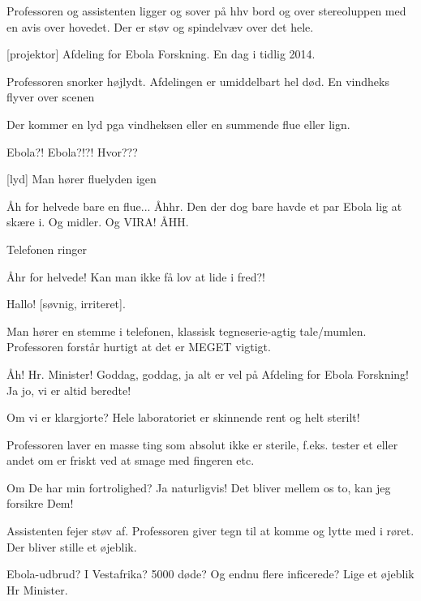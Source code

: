 \documentclass[a4paper,11pt]{article}
\begin{document}
\begin{sketch}

\scene Professoren og assistenten ligger og sover på hhv bord og over stereoluppen med en avis over hovedet. Der er støv og spindelvæv over det hele.

[projektor] Afdeling for Ebola Forskning. En dag i tidlig 2014.

\scene Professoren snorker højlydt. Afdelingen er umiddelbart hel død. En vindheks flyver over scenen 

\scene Der kommer en lyd pga vindheksen eller en summende flue eller lign.


 Ebola?! Ebola?!?! Hvor???

[lyd] Man hører fluelyden igen

 Åh for helvede bare en flue... Åhhr. Den der dog bare havde et par Ebola lig at skære i. Og midler. Og VIRA! ÅHH.


\scene Telefonen ringer

 Åhr for helvede! Kan man ikke få lov at lide i fred?!

 Hallo! [søvnig, irriteret].

\scene Man hører en stemme i telefonen, klassisk tegneserie-agtig tale/mumlen. Professoren forstår hurtigt at det er MEGET vigtigt.

 Åh! Hr. Minister! Goddag, goddag, ja alt er vel på Afdeling for Ebola Forskning! Ja jo, vi er altid beredte!


 Om vi er klargjorte? Hele laboratoriet er skinnende rent og helt sterilt!

\scene Professoren laver en masse ting som absolut ikke er sterile, f.eks. tester et eller andet om er friskt ved at smage med fingeren etc.

 Om De har min fortrolighed? Ja naturligvis! Det bliver mellem os to, kan jeg forsikre Dem!

\scene Assistenten fejer støv af. Professoren giver tegn til at komme og lytte med i røret. Der bliver stille et øjeblik.

 Ebola-udbrud? I Vestafrika? 5000 døde? Og endnu flere inficerede? Lige et øjeblik Hr Minister.


\end{sketch}
\end{document}
